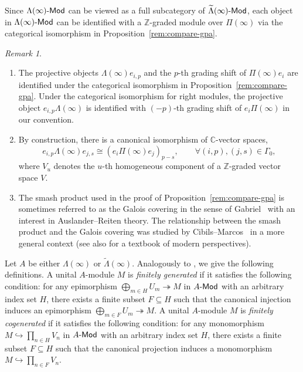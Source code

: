 \documentclass[12pt]{amsart}
\theoremstyle{definition}
\theoremstyle{remark}
\newtheorem{remark}[theorem]{Remark}
\numberwithin{equation}{section}
\newcommand{\Mod}{\mathchar`-\mathsf{Mod}}
\begin{document}
Since ${\Lambda}(\infty)\mathchar`-\mathsf{Mod}$ can be viewed as a full subcategory of $\widetilde{\Lambda}(\infty)\mathchar`-\mathsf{Mod}$, each object in ${\Lambda}(\infty)\mathchar`-\mathsf{Mod}$ can be identified with a $\mathbb{Z}$-graded module over $\Pi(\infty)$ via the categorical isomorphism in Proposition~\ref{rem:compare-gpa}.
\begin{remark}
    \begin{enumerate}
        \item[(i)] The projective objects $\Lambda(\infty)e_{i,p}$ and the $p$-th grading shift of $\Pi(\infty)e_i$ are identified under the categorical isomorphism in Proposition~\ref{rem:compare-gpa}. Under the categorical isomorphism for right modules, the projective object $e_{i,p}\Lambda(\infty)$ is identified with $(-p)$-th grading shift of $e_i \Pi(\infty)$ in our convention.
        \item[(ii)] By construction, there is a canonical isomorphism of $\mathbb{C}$-vector spaces,
\[ e_{i,p} \Lambda(\infty) e_{j,s} \cong (e_i \Pi(\infty) e_j)_{p-s}, \qquad \forall (i,p), (j,s) \in \Gamma_0,\]
 where $V_{u}$ denotes the $u$-th homogeneous component of a $\mathbb{Z}$-graded vector space $V$. 
        \item[(iii)] The smash product used in the proof of Proposition~\ref{rem:compare-gpa} is sometimes referred to as the Galois covering in the sense of Gabriel~\cite{Gab81} with an interest in Auslander--Reiten theory. The relationship between the smash product and the Galois covering was studied by Cibils--Marcos~\cite{CM06} in a more general context (see also \cite{Asas22} for a textbook of modern perspectives).
    \end{enumerate}
\end{remark}



Let $A$ be either $\Lambda(\infty)$ or $\widetilde{\Lambda}(\infty)$.
Analogously to \cite[\S 10]{AF92}, we give the following definitions. 
A unital $A$-module $M$ is \emph{finitely generated} if it satisfies the following condition: for any epimorphism $\bigoplus_{m\in H} U_m \twoheadrightarrow M$ in $A\Mod$ with an arbitrary index set $H$, there exists a finite subset $F\subseteq H$ such that the canonical injection induces an epimorphism $\bigoplus_{m\in F} U_{m} \twoheadrightarrow M$.
A unital $A$-module $M$ is \emph{finitely cogenerated} if it satisfies the following condition: for any monomorphism $M \hookrightarrow \prod_{n\in H} V_n$ in $A\Mod$ with an arbitrary index set $H$,
there exists a finite subset $F\subseteq H$ such that the canonical projection induces a monomorphism $M \hookrightarrow \prod_{n\in F} V_n$.
\end{document}
